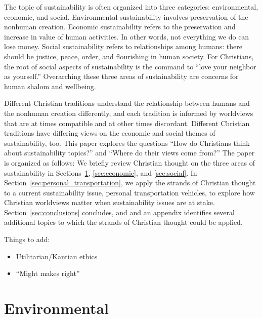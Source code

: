 \documentclass[12pt]{article}
\begin{document}
The topic of sustainability is often organized into three categories: 
environmental, economic, and social. 
Environmental sustainability involves preservation of the nonhuman creation.
Economic sustainability refers to
the preservation and increase in value of human activities. 
In other words, not everything we do can lose money. 
Social sustainability refers to relationships among humans: 
there should be justice, peace, order, and flourishing in human society. 
For Christians, the root of social aspects of sustainability
is the command to ``love your neighbor as yourself.'' 
Overarching these three areas of sustainability are 
concerns for human shalom and wellbeing.

Different Christian traditions understand the relationship 
between humans and the nonhuman creation differently, and
each tradition is informed by worldviews 
that are at times compatible and at other times discordant. 
Different Christian traditions have differing views 
on the economic and social themes of sustainability, too.
This paper explores the questions 
``How do Christians think about sustainability topics?'' 
and 
``Where do their views come from?'' 
The paper is organized as follows:
We briefly review Christian thought on the three areas of sustainability
in Sections~\ref{sec:environmental}, \ref{sec:economic}, and \ref{sec:social}.
In Section~\ref{sec:personal_transportation}, 
we apply the strands of Christian thought
to a current sustainability issue,
personal transportation vehicles,
to explore how Christian worldviews matter 
when sustainability issues are at stake.
Section~\ref{sec:conclusions} concludes, and
and an appendix identifies several additional topics to which 
the strands of Christian thought could be applied.

Things to add:

\begin{itemize}

  \item Utilitarian/Kantian ethics

  \item ``Might makes right''

\end{itemize}


\section{Environmental}
\label{sec:environmental}
\end{document}

